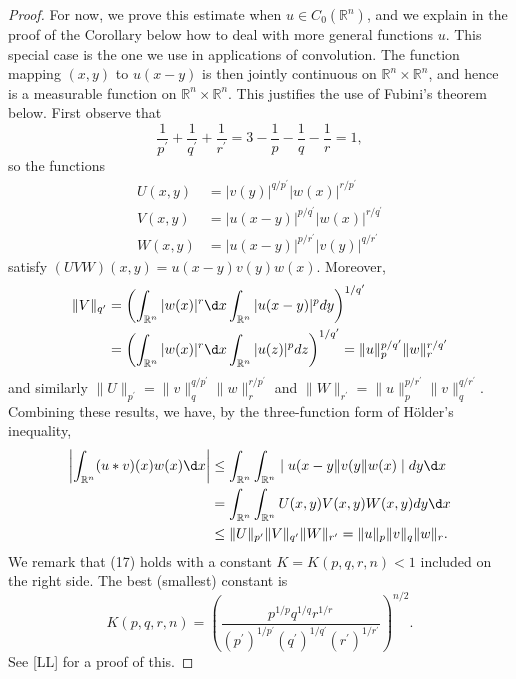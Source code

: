 \begin{proof}
  For now, we prove this estimate when $u \in C_0(\mathbb{R}^n)$,
  and we explain in the proof of the Corollary below how to deal with more general functions $u$. 
  This special case is the one we use in applications of convolution.
  The function mapping $(x, y)$ to $u(x-y)$ is then jointly continuous
  on $\mathbb{R}^n \times \mathbb{R}^n$, and hence is a measurable function
  on $\mathbb{R}^n \times \mathbb{R}^n$. This justifies the use of Fubini's theorem below.
  First observe that
  \[
  \frac{1}{p^{\prime}}+\frac{1}{q^{\prime}}+\frac{1}{r^{\prime}}
    = 3 - \frac{1}{p} - \frac{1}{q} - \frac{1}{r} = 1,
  \]
  so the functions
  \[
  \begin{aligned}
  U(x, y) & = |v(y)|^{q / p^{\prime}}|w(x)|^{r / p^{\prime}} \\
  V(x, y) & = |u(x-y)|^{p / q^{\prime}}|w(x)|^{r / q^{\prime}} \\
  W(x, y) & = |u(x-y)|^{p / r^{\prime}}|v(y)|^{q / r^{\prime}}
  \end{aligned}
  \]
  satisfy $(U V W)(x, y)=u(x-y) v(y) w(x)$. Moreover,
  \[
  \begin{aligned}
  \|V\|_{q^{\prime}} & =\left(\int_{\mathbb{R}^n}|w(x)|^r \d x \int_{\mathbb{R}^n}|u(x-y)|^p d y\right)^{1 / q^{\prime}} \\
  & =\left(\int_{\mathbb{R}^n}|w(x)|^r \d x \int_{\mathbb{R}^n}|u(z)|^p d z\right)^{1 / q^{\prime}}=\|u\|_p^{p / q^{\prime}}\|w\|_r^{r / q^{\prime}}
  \end{aligned}
  \]
  and similarly $\|U\|_{p^{\prime}}=\|v\|_q^{q / p^{\prime}}\|w\|_r^{r / p^{\prime}}$ and $\|W\|_{r^{\prime}}=\|u\|_p^{p / r^{\prime}}\|v\|_q^{q / r^{\prime}}$. Combining these results, we have, by the three-function form of Hölder's inequality,
  \[
  \begin{aligned}
  \left|\int_{\mathbb{R}^n}(u * v)(x) w(x) \d x\right| & \leq \int_{\mathbb{R}^n} \int_{\mathbb{R}^n} \mid u(x-y \| v(y \| w(x) \mid d y \d x \\
  & =\int_{\mathbb{R}^n} \int_{\mathbb{R}^n} U(x, y) V(x, y) W(x, y) d y \d x \\
  & \leq\|U\|_{p^{\prime}}\|V\|_{q^{\prime}}\|W\|_{r^{\prime}}=\|u\|_p\|v\|_q\|w\|_r.
  \end{aligned}
  \]
  We remark that (17) holds with a constant $K=K(p, q, r, n)<1$ included on the right side. The best (smallest) constant is
  \[
  K(p, q, r, n) = \left(\frac{p^{1 / p} q^{1 / q} r^{1 / r}}{\left(p^{\prime}\right)^{1 / p^{\prime}}\left(q^{\prime}\right)^{1 / q^{\prime}}\left(r^{\prime}\right)^{1 / r^{\prime}}}\right)^{n / 2}.
  \]
  See [LL] for a proof of this.
\end{proof}


